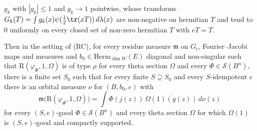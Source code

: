 \begin{proposition}
\begin{enumerate}[label=(\roman*)]
$g_k$ with $|g_k|\le1$ and $g_k\to1$ pointwise, whose transforms $G_k(T)=\int g_k(x)\psi(\frac12\tr(xT))\,d\lambda(x)$ are non-negative on hermitian
$T$ and tend to $0$ uniformly on every closed set of non-zero hermitian $T$ with $eT=T$.
\end{enumerate}
Then in the setting of (RC), for every residue measure $\mathfrak m$ on $G_t$, Fourier--Jacobi maps and measures and $b_0\in\mathrm{Herm}_{\dim W}(E)$
diagonal and non-singular such that $\mathrm R(\varphi_\Phi,1,\Omega)$ is of type $\rho$ for every theta section $\Omega$ and every
$\Phi\in\mathcal S(B^n)$, there is a finite set $S_0$ such that for every finite $S\supseteq S_0$ and every $S$-idempotent $e$ there is an orbital measure
$\nu$ for $(B,b_0,e)$ with
\[
\mathfrak m\bigl(\mathrm R(\varphi_\Phi,1,\Omega)\bigr)=\int\Phi(j(z))\,\overline{\Omega(1)(y(z))}\,d\nu(z)
\]
for every $(S,e)$-good $\Phi\in\mathcal S(B^n)$ and every theta section $\Omega$ for which $\Omega(1)$ is $(S,e)$-good and compactly supported.
\end{proposition}

